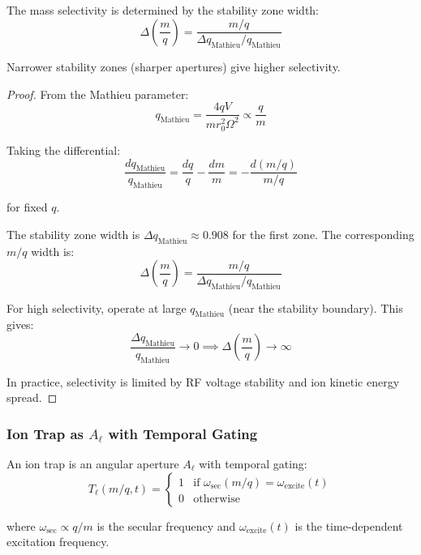 \begin{corollary}
\label{cor:quadrupole_selectivity}
The mass selectivity is determined by the stability zone width:
\begin{equation}
\Delta\left(\frac{m}{q}\right) = \frac{m/q}{\Delta q_{\text{Mathieu}}/q_{\text{Mathieu}}}
\end{equation}

Narrower stability zones (sharper apertures) give higher selectivity.
\end{corollary}

\begin{proof}
From the Mathieu parameter:
\begin{equation}
q_{\text{Mathieu}} = \frac{4qV}{mr_0^2\Omega^2} \propto \frac{q}{m}
\end{equation}

Taking the differential:
\begin{equation}
\frac{dq_{\text{Mathieu}}}{q_{\text{Mathieu}}} = \frac{dq}{q} - \frac{dm}{m} = -\frac{d(m/q)}{m/q}
\end{equation}

for fixed $q$.

The stability zone width is $\Delta q_{\text{Mathieu}} \approx 0.908$ for the first zone. The corresponding $m/q$ width is:
\begin{equation}
\Delta\left(\frac{m}{q}\right) = \frac{m/q}{\Delta q_{\text{Mathieu}}/q_{\text{Mathieu}}}
\end{equation}

For high selectivity, operate at large $q_{\text{Mathieu}}$ (near the stability boundary). This gives:
\begin{equation}
\frac{\Delta q_{\text{Mathieu}}}{q_{\text{Mathieu}}} \to 0 \implies \Delta\left(\frac{m}{q}\right) \to \infty
\end{equation}

In practice, selectivity is limited by RF voltage stability and ion kinetic energy spread.
\end{proof}

\subsubsection{Ion Trap as $A_\ell$ with Temporal Gating}

\begin{theorem}
\label{thm:trap_gated}
An ion trap is an angular aperture $A_\ell$ with temporal gating:
\begin{equation}
T_\ell(m/q, t) = \begin{cases}
1 & \text{if } \omega_{\text{sec}}(m/q) = \omega_{\text{excite}}(t) \\
0 & \text{otherwise}
\end{cases}
\end{equation}

where $\omega_{\text{sec}} \propto q/m$ is the secular frequency and $\omega_{\text{excite}}(t)$ is the time-dependent excitation frequency.
\end{theorem}

